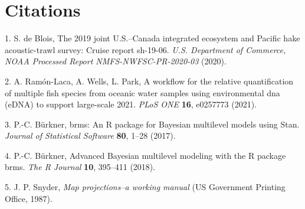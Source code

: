 \documentclass[
]{article}
\begin{document}
\clearpage

\hypertarget{citations}{%
\section*{Citations}\label{citations}}

\hypertarget{refs}{}
\leavevmode\hypertarget{ref-deBlois2020survey}{}%
1. S. de Blois, The 2019 joint U.S.--Canada integrated ecosystem and
Pacific hake acoustic-trawl survey: Cruise report sh-19-06. \emph{U.S.
Department of Commerce, NOAA Processed Report NMFS-NWFSC-PR-2020-03}
(2020).

\leavevmode\hypertarget{ref-ramon-laca2021PLOS}{}%
2. A. Ramón-Laca, A. Wells, L. Park, A workflow for the relative
quantification of multiple fish species from oceanic water samples using
environmental dna (eDNA) to support large-scale 2021. \emph{PLoS ONE}
\textbf{16}, e0257773 (2021).

\leavevmode\hypertarget{ref-brms2017}{}%
3. P.-C. Bürkner, brms: An R package for Bayesian multilevel models
using Stan. \emph{Journal of Statistical Software} \textbf{80}, 1--28
(2017).

\leavevmode\hypertarget{ref-brms2018}{}%
4. P.-C. Bürkner, Advanced Bayesian multilevel modeling with the R
package brms. \emph{The R Journal} \textbf{10}, 395--411 (2018).

\leavevmode\hypertarget{ref-snyder1987map}{}%
5. J. P. Snyder, \emph{Map projections--a working manual} (US Government
Printing Office, 1987).
\end{document}

